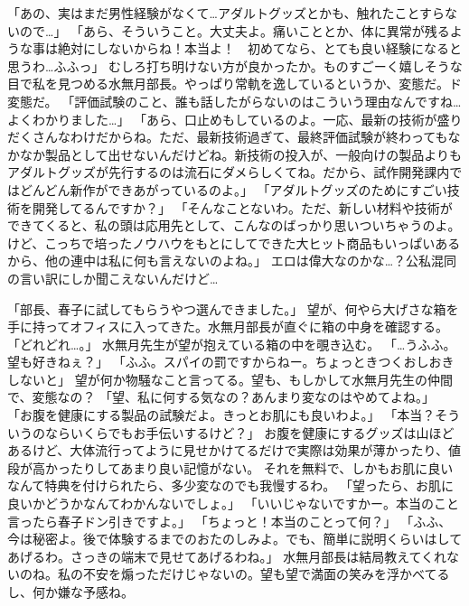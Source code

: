 「あの、実はまだ男性経験がなくて…アダルトグッズとかも、触れたことすらないので…」
「あら、そういうこと。大丈夫よ。痛いこととか、体に異常が残るような事は絶対にしないからね！本当よ！　初めてなら、とても良い経験になると思うわ…ふふっ」
むしろ打ち明けない方が良かったか。ものすごーく嬉しそうな目で私を見つめる水無月部長。やっぱり常軌を逸しているというか、変態だ。ド変態だ。
「評価試験のこと、誰も話したがらないのはこういう理由なんですね…よくわかりました…」
「あら、口止めもしているのよ。一応、最新の技術が盛りだくさんなわけだからね。ただ、最新技術過ぎて、最終評価試験が終わってもなかなか製品として出せないんだけどね。新技術の投入が、一般向けの製品よりもアダルトグッズが先行するのは流石にダメらしくてね。だから、試作開発課内ではどんどん新作ができあがっているのよ。」
「アダルトグッズのためにすごい技術を開発してるんですか？」
「そんなことないわ。ただ、新しい材料や技術ができてくると、私の頭は応用先として、こんなのばっかり思いついちゃうのよ。けど、こっちで培ったノウハウをもとにしてできた大ヒット商品もいっぱいあるから、他の連中は私に何も言えないのよね。」
エロは偉大なのかな…？公私混同の言い訳にしか聞こえないんだけど…

「部長、春子に試してもらうやつ選んできました。」
望が、何やら大げさな箱を手に持ってオフィスに入ってきた。水無月部長が直ぐに箱の中身を確認する。
「どれどれ…。」
水無月先生が望が抱えている箱の中を覗き込む。
「…うふふ。望も好きねぇ？」
「ふふ。スパイの罰ですからねー。ちょっときつくおしおきしないと」
望が何か物騒なこと言ってる。望も、もしかして水無月先生の仲間で、変態なの？
「望、私に何する気なの？あんまり変なのはやめてよね。」
「お腹を健康にする製品の試験だよ。きっとお肌にも良いわよ。」
「本当？そういうのならいくらでもお手伝いするけど？」
お腹を健康にするグッズは山ほどあるけど、大体流行ってように見せかけてるだけで実際は効果が薄かったり、値段が高かったりしてあまり良い記憶がない。
それを無料で、しかもお肌に良いなんて特典を付けられたら、多少変なのでも我慢するわ。
「望ったら、お肌に良いかどうかなんてわかんないでしょ。」
「いいじゃないですかー。本当のこと言ったら春子ドン引きですよ。」
「ちょっと！本当のことって何？」
「ふふ、今は秘密よ。後で体験するまでのおたのしみよ。でも、簡単に説明くらいはしてあげるわ。さっきの端末で見せてあげるわね。」
水無月部長は結局教えてくれないのね。私の不安を煽っただけじゃないの。望も望で満面の笑みを浮かべてるし、何か嫌な予感ね。

